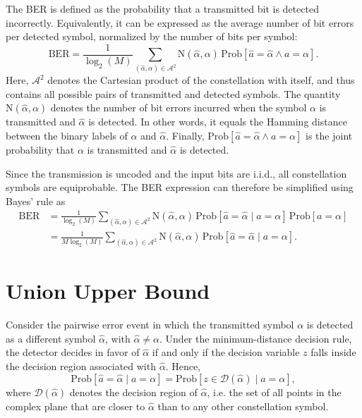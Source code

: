 The \ac{BER} is defined as the probability that a transmitted bit is detected incorrectly.
Equivalently, it can be expressed as the average number of bit errors per detected symbol, normalized by the number of bits per symbol:
\begin{equation}
\label{eq:ber_definition}
    \mathrm{BER} = \frac{1}{\log_2(M)} \sum_{(\hat{\alpha}, \alpha) \in \mathcal{A}^{2}} \mathrm{N}(\hat{\alpha}, \alpha)\, \mathrm{Prob}[\hat{a} = \hat{\alpha} \land a = \alpha].
\end{equation}
Here, $\mathcal{A}^{2}$ denotes the Cartesian product of the constellation with itself, and thus contains all possible pairs of transmitted and detected symbols.
The quantity $\mathrm{N}(\hat{\alpha}, \alpha)$ denotes the number of bit errors incurred when the symbol $\alpha$ is transmitted and $\hat{\alpha}$ is detected.
In other words, it equals the Hamming distance between the binary labels of $\alpha$ and $\hat{\alpha}$.
Finally, $\mathrm{Prob}[\hat{a} = \hat{\alpha} \land a = \alpha]$ is the joint probability that $\alpha$ is transmitted and $\hat{\alpha}$ is detected.

Since the transmission is uncoded and the input bits are \ac{i.i.d.}, all constellation symbols are equiprobable.
The \ac{BER} expression can therefore be simplified using Bayes' rule as
\begin{subequations}
\label{eq:ber_simplified}
\begin{align}
    \mathrm{BER}
    &= \frac{1}{\log_2(M)} \sum_{(\hat{\alpha}, \alpha) \in \mathcal{A}^{2}} \mathrm{N}(\hat{\alpha}, \alpha)\, \mathrm{Prob}[\hat{a} = \hat{\alpha} \mid a = \alpha]\, \mathrm{Prob}[a = \alpha] \\
    &= \frac{1}{M \log_2(M)} \sum_{(\hat{\alpha}, \alpha) \in \mathcal{A}^{2}} \mathrm{N}(\hat{\alpha}, \alpha) \, \mathrm{Prob}[\hat{a} = \hat{\alpha} \mid a = \alpha].
\end{align}
\end{subequations}


\section{Union Upper Bound}
\label{appendix_section:union_upper_bound}

Consider the pairwise error event in which the transmitted symbol $\alpha$ is detected as a different symbol $\hat{\alpha}$, with $\hat{\alpha} \neq \alpha$.
Under the minimum-distance decision rule, the detector decides in favor of $\hat{\alpha}$ if and only if the decision variable $z$ falls inside the decision region associated with $\hat{\alpha}$.
Hence,
\begin{equation}
    \mathrm{Prob}[\hat{a} = \hat{\alpha} \mid a = \alpha] = \mathrm{Prob}[z \in \mathcal{D}(\hat{\alpha}) \mid a = \alpha],
\end{equation}
where $\mathcal{D}(\hat{\alpha})$ denotes the decision region of $\hat{\alpha}$, i.e. the set of all points in the complex plane that are closer to $\hat{\alpha}$ than to any other constellation symbol.

